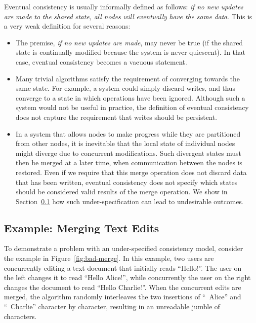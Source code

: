 Eventual consistency is usually informally defined as follows: \emph{if no new updates are made to the shared state, all nodes will eventually have the same data}.
This is a very weak definition for several reasons:
\begin{itemize}
\item The premise, \emph{if no new updates are made}, may never be true (if the shared state is continually modified because the system is never quiescent).
In that case, eventual consistency becomes a vacuous statement.

\item Many trivial algorithms satisfy the requirement of converging towards the same state.
For example, a system could simply discard writes, and thus converge to a state in which operations have been ignored.
Although such a system would not be useful in practice, the definition of eventual consistency does not capture the requirement that writes should be persistent.

\item In a system that allows nodes to make progress while they are partitioned from other nodes, it is inevitable that the local state of individual nodes might diverge due to concurrent modifications.
Such divergent states must then be merged at a later time, when communication between the nodes is restored.
Even if we require that this merge operation does not discard data that has been written, eventual consistency does not specify which states should be considered valid results of the merge operation.
We show in Section~\ref{sec:bad-merge} how such under-specification can lead to undesirable outcomes.
\end{itemize}

\subsection{Example: Merging Text Edits}\label{sec:bad-merge}

To demonstrate a problem with an under-specified consistency model, consider the example in Figure~\ref{fig:bad-merge}.
In this example, two users are concurrently editing a text document that initially reads ``Hello!''.
The user on the left changes it to read ``Hello Alice!'', while concurrently the user on the right changes the document to read ``Hello Charlie!''.
When the concurrent edits are merged, the algorithm randomly interleaves the two insertions of ``~Alice'' and ``~Charlie'' character by character, resulting in an unreadable jumble of characters.

